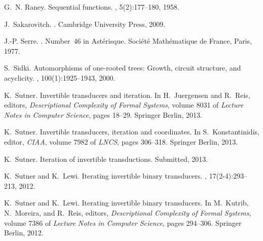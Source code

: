 \documentclass[12pt]{svmult}
\begin{document}
\begin{thebibliography}{10}
G.~N. Raney.
\newblock Sequential functions.
, 5(2):177--180, 1958.

J.~Sakarovitch.
.
\newblock Cambridge University Press, 2009.

J.-P. Serre.
.
\newblock Number~46 in Ast\'erisque. Soci\'et\'e Math\'ematique de France,
  Paris, 1977.

S.~Sidki.
\newblock Automorphisms of one-rooted trees: Growth, circuit structure, and
  acyclicity.
, 100(1):1925--1943, 2000.

K.~Sutner.
\newblock Invertible transducers and iteration.
\newblock In H.~Juergensen and R.~Reis, editors, {\em Descriptional Complexity
  of Formal Systems}, volume 8031 of {\em Lecture Notes in Computer Science},
  pages 18--29. Springer Berlin, 2013.

K.~Sutner.
\newblock Invertible transducers, iteration and coordinates.
\newblock In S.~Konstantinidis, editor, {\em CIAA}, volume 7982 of {\em LNCS},
  pages 306--318. Springer Berlin, 2013.

K.~Sutner.
\newblock Iteration of invertible transductions.
\newblock Submitted, 2013.

K.~Sutner and K.~Lewi.
\newblock Iterating invertible binary transducers.
, 17(2-4):293--213, 2012.

K.~Sutner and K.~Lewi.
\newblock Iterating invertible binary transducers.
\newblock In M.~Kutrib, N.~Moreira, and R.~Reis, editors, {\em Descriptional
  Complexity of Formal Systems}, volume 7386 of {\em Lecture Notes in Computer
  Science}, pages 294--306. Springer Berlin, 2012.

\end{thebibliography}


\end{document}
